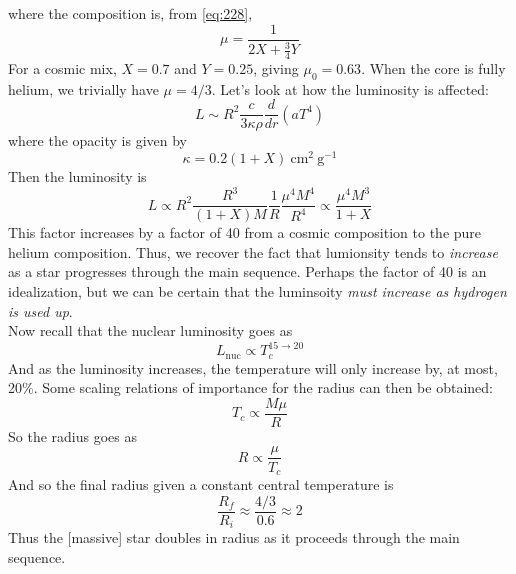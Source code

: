 \documentclass[10pt]{article}
\numberwithin{equation}{section}
\newcommand{\n}{\noindent}
\begin{document}
    where the composition is, from \eqref{eq:228},
    \begin{equation}
      \label{eq:230}
      \mu = \frac{1}{2X+\frac{3}{4}Y}
    \end{equation}
    For a cosmic mix, $X=0.7$ and $Y=0.25$, giving $\mu_0=0.63$. When
    the core is fully helium, we trivially have $\mu=4/3$. Let's look
    at how the luminosity is affected:
    \begin{equation}
      \label{eq:231}
      L\sim R^2\frac{c}{3\kappa\rho}\frac{d}{dr}\left(aT^4\right)
    \end{equation}
    where the opacity is given by
    \begin{equation}
      \label{eq:232}
      \kappa = 0.2(1+X)\ \mathrm{cm^2\ g^{-1}}
    \end{equation}
    Then the luminosity is
    \begin{equation}
      \label{eq:233}
      L\propto R^2\frac{R^3}{(1+X)M}\frac{1}{R}\frac{\mu^4M^4}{R^4}\propto
\frac{\mu^4M^3}{1+X}
    \end{equation}
    This factor increases by a factor of 40 from a cosmic composition
    to the pure helium composition. Thus, we recover the fact that
    lumionsity tends to \emph{increase} as a star progresses through
    the main sequence. Perhaps the factor of 40 is an idealization,
    but we can be certain that the luminsoity \emph{must increase as
      hydrogen is used up}.\\

    \n Now recall that the nuclear luminosity goes as
    \begin{equation}
      \label{eq:235}
      L_{\mathrm{nuc}}\propto T_c^{15\to 20}
    \end{equation}
    And as the luminosity increases, the temperature will only
    increase by, at most, 20\%. Some scaling relations of importance
    for the radius can then be obtained:
    \begin{equation}
      \label{eq:236}
      T_c\propto\frac{M\mu}{R}
    \end{equation}
    So the radius goes as
    \begin{equation}
      \label{eq:237}
      R\propto\frac{\mu}{T_c}
    \end{equation}
    And so the final radius given a constant central temperature is
    \begin{equation}
      \label{eq:238}
      \frac{R_f}{R_i}\approx \frac{4/3}{0.6}\approx 2
    \end{equation}
    Thus the [massive] star doubles in radius as it proceeds through the main 
    sequence.
\end{document}
